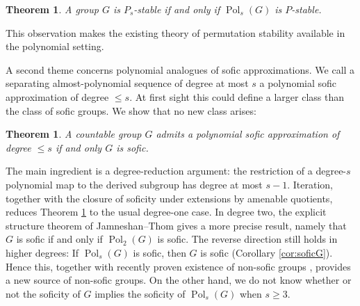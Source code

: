 \documentclass[a4paper,12pt]{amsart}
\theoremstyle{plain}
\newtheorem{theorem}[subsection]{{\bf Theorem}}
\theoremstyle{definition}
\theoremstyle{remark}
\numberwithin{equation}{subsection}
\DeclareMathOperator{\Pold}{Pol}
\begin{document}
\begin{theorem}
    \label{thm:Pscharacterization}
    A group $G$ is $P_s$-stable if and only if $\Pold_s(G)$ is $P$-stable.
\end{theorem}

This observation makes the existing theory of permutation stability
available in the polynomial setting.  

A second theme concerns polynomial analogues of sofic approximations.  We
call a separating almost-polynomial sequence of degree at most $s$ a
polynomial sofic approximation of degree $\le s$.  At first sight this could
define a larger class than the class of sofic groups.  We show that no new
class arises:

\begin{theorem}
    \label{thm:soficcharacterization}
    A countable group $G$ admits a polynomial sofic approximation of degree $\le s$ if and only $G$ is sofic.
\end{theorem}

The main ingredient is
a degree-reduction argument: the restriction of a degree-$s$ polynomial
map to the derived subgroup has degree at most $s-1$.  Iteration, together
with the closure of soficity under extensions by amenable quotients,
reduces Theorem \ref{thm:soficcharacterization} to the usual degree-one case.
In degree two, the explicit structure theorem of Jamneshan--Thom gives a
more precise result, namely that $G$ is sofic if and only if $\Pold_2(G)$ is sofic. The reverse direction still holds in higher degrees: If $\Pold_s(G)$ is sofic, then $G$ is sofic (Corollary \ref{cor:soficG}). Hence this, together with recently proven existence of non-sofic groups \cite{Ope26}, provides a new source of non-sofic groups. On the other hand, we do not know whether or not the soficity of $G$ implies the soficity of $\Pold_s(G)$ when $s\ge 3$.
\end{document}
